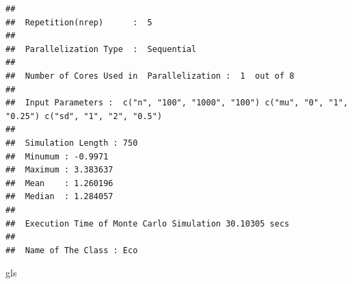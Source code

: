 \documentclass[11pt,a4paper]{article}
\newenvironment{Shaded}{\begin{snugshade}}{\end{snugshade}}
\newcommand{\NormalTok}[1]{#1}
\begin{document}
\begin{verbatim}
## 
##  Repetition(nrep)      :  5 
## 
##  Parallelization Type  :  Sequential 
## 
##  Number of Cores Used in  Parallelization :  1  out of 8 
## 
##  Input Parameters :  c("n", "100", "1000", "100") c("mu", "0", "1", "0.25") c("sd", "1", "2", "0.5") 
## 
##  Simulation Length : 750 
##  Minumum : -0.9971 
##  Maximum : 3.383637 
##  Mean    : 1.260196 
##  Median  : 1.284057 
## 
##  Execution Time of Monte Carlo Simulation 30.10305 secs 
## 
##  Name of The Class : Eco
\end{verbatim}

\begin{Shaded}
\begin{Highlighting}[]
\NormalTok{gls}
\end{Highlighting}
\end{Shaded}
\end{document}
